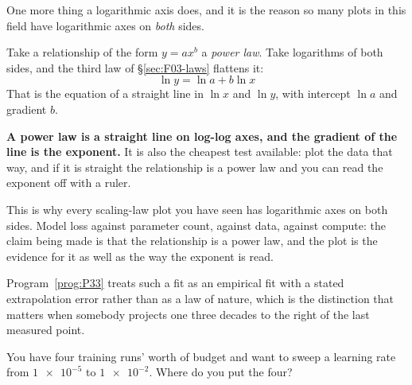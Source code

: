 
\begin{fr}
One more thing a logarithmic axis does, and it is the reason so many plots in
this field have logarithmic axes on \emph{both} sides.

Take a relationship of the form $y = a x^{b}$ \dash{} a \emph{power law}. Take
logarithms of both sides, and the third law of \S\ref{sec:F03-laws} flattens
it:
\[ \ln y = \ln a + b \ln x \]
That is the equation of a straight line in $\ln x$ and $\ln y$, with intercept
$\ln a$ and gradient $b$.

\textbf{A power law is a straight line on log-log axes, and the gradient of the
line is the exponent.} It is also the cheapest test available: plot the data
that way, and if it is straight the relationship is a power law and you can
read the exponent off with a ruler.

\begin{aibox}
This is why every scaling-law plot you have seen has logarithmic axes on both
sides. Model loss against parameter count, against data, against compute: the
claim being made is that the relationship is a power law, and the plot is the
evidence for it as well as the way the exponent is read.

Program~\ref{prog:P33} treats such a fit as an empirical fit with a stated
extrapolation error rather than as a law of nature, which is the distinction
that matters when somebody projects one three decades to the right of the last
measured point.
\end{aibox}

You have four training runs' worth of budget and want to sweep a learning rate
from $\num{1e-5}$ to $\num{1e-2}$. Where do you put the four?
\nextframe
\end{fr}

